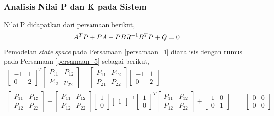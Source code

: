 \documentclass[../main.tex]{subfiles}
\begin{document}
            \subsubsection{Analisis Nilai P dan K pada Sistem}
                Nilai P didapatkan dari persamaan berikut,
                \begin{equation}
                    A^T P+PA-PBR^{-1} B^T P+Q = 0 \\[5pt]
                    \label{persamaan_5}
                \end{equation}
                Pemodelan \textit{state space} pada Persamaan \eqref{persamaan_4} dianalisis dengan rumus pada Persamaan \eqref{persamaan_5} sebagai berikut,
                \begin{equation}
                    \begin{split}
                        \begin{bmatrix} -1 & 1 \\ 0 & 2 \end{bmatrix}^T \begin{bmatrix} P_{11} & P_{12} \\ P_{12} & p_{22} \end{bmatrix} + \begin{bmatrix} P_{11} & P_{12} \\ P_{21} & P_{22} \end{bmatrix} \begin{bmatrix} -1 & 1 \\ 0 & 2 \end{bmatrix} - &\\ \begin{bmatrix} P_{11} & P_{12} \\ P_{12} & P_{22} \end{bmatrix} - \begin{bmatrix} P_{11} & P_{12} \\ P_{12} & P_{22} \end{bmatrix}\begin{bmatrix} 1 \\ 0 \end{bmatrix} \begin{bmatrix} 1 \end{bmatrix}^{-1}\begin{bmatrix} 1 \\ 0 \end{bmatrix}^T \begin{bmatrix} P_{11} & P_{12} \\ P_{12} & P_{22} \end{bmatrix} +  \begin{bmatrix} 1 & 0 \\ 0 & 1 \end{bmatrix} &= \begin{bmatrix} 0 & 0 \\ 0 & 0 \end{bmatrix}\\[10pt]

\end{split}
\end{equation}
\end{document}
